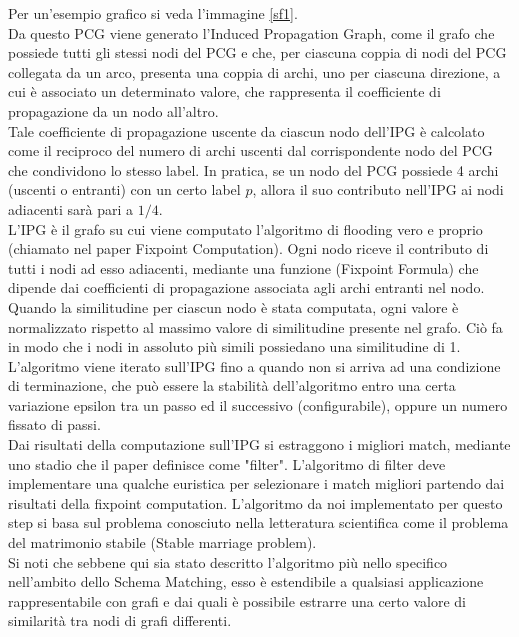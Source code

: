 \documentclass[a4paper,10pt]{article}
\begin{document}
Per un'esempio grafico si veda l'immagine \ref{sf1}.\\

Da questo PCG viene generato l'Induced Propagation Graph, come il grafo che possiede tutti gli stessi nodi del PCG e che, per ciascuna coppia di nodi del PCG collegata da un arco, presenta una coppia di archi, uno per ciascuna direzione, a cui è associato un determinato valore, che rappresenta il coefficiente di propagazione da un nodo all'altro.\\

Tale coefficiente di propagazione uscente da ciascun nodo dell'IPG è calcolato come il reciproco del numero di archi uscenti dal corrispondente nodo del PCG che condividono lo stesso label. In pratica, se un nodo del PCG possiede 4 archi (uscenti o entranti) con un certo label $p$, allora il suo contributo nell'IPG ai nodi adiacenti sarà pari a $1/4$.\\

L’IPG è il grafo su cui viene computato l’algoritmo di flooding vero e proprio (chiamato nel paper Fixpoint Computation). Ogni nodo riceve il contributo di tutti i nodi ad esso adiacenti, mediante una funzione (Fixpoint Formula) che dipende dai coefficienti di propagazione associata agli archi entranti nel nodo. Quando la similitudine per ciascun nodo è stata computata, ogni valore è normalizzato rispetto al massimo valore di similitudine presente nel grafo. Ciò fa in modo che i nodi in assoluto più simili possiedano una similitudine di 1.\\

L’algoritmo viene iterato sull’IPG fino a quando non si arriva ad una condizione di terminazione, che può essere la stabilità dell’algoritmo entro una certa variazione epsilon tra un passo ed il successivo (configurabile), oppure un numero fissato di passi.\\

Dai risultati della computazione sull’IPG si estraggono i migliori match, mediante uno stadio che il paper definisce come "filter". L'algoritmo di filter deve implementare una qualche euristica per selezionare i match migliori partendo dai risultati della fixpoint computation. L'algoritmo da noi implementato per questo step si basa sul problema conosciuto nella letteratura scientifica come il problema del matrimonio stabile (Stable marriage problem).\\

Si noti che sebbene qui sia stato descritto l'algoritmo più nello specifico nell'ambito dello Schema Matching, esso è estendibile a qualsiasi applicazione rappresentabile con grafi e dai quali è possibile estrarre una certo valore di similarità tra nodi di grafi differenti. \\
\end{document}
